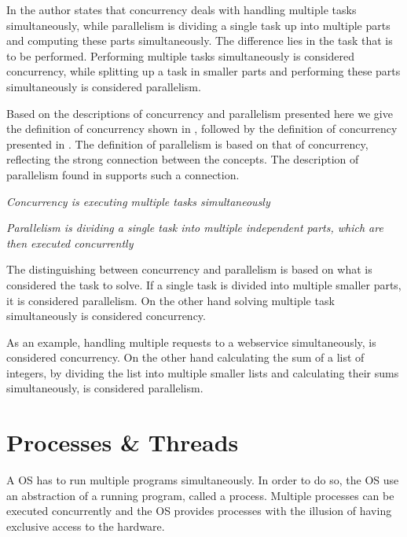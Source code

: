 In \cite[p. 24]{sevenModels} the author states that concurrency deals with handling multiple tasks simultaneously, while parallelism is dividing a single task up into multiple parts and computing these parts simultaneously. The difference lies in the task that is to be performed. Performing multiple tasks simultaneously is considered concurrency, while splitting up a task in smaller parts and performing these parts simultaneously is considered parallelism.

Based on the descriptions of concurrency and parallelism presented here we give the definition of concurrency shown in , followed by the definition of concurrency presented in . The definition of parallelism is based on that of concurrency, reflecting the strong connection between the concepts. The description of parallelism found in \cite{introPar} supports such a connection.
\begin{defn}\label{def:concurrency}
\emph{Concurrency is executing multiple tasks simultaneously}
\end{defn}

\begin{defn}\label{def:parallelism}
\emph{Parallelism is dividing a single task into multiple independent parts, which are then executed concurrently}
\end{defn}
The distinguishing between concurrency and parallelism is based on what is considered the task to solve. If a single task is divided into multiple smaller parts, it is considered parallelism. On the other hand solving multiple task simultaneously is considered concurrency.

As an example, handling multiple requests to a webservice simultaneously, is considered concurrency. On the other hand calculating the sum of a list of integers, by dividing the list into multiple smaller lists and calculating their sums simultaneously, is considered parallelism.

\section{Processes \& Threads}\label{sec:processes_threads}
A \ac{OS} has to run multiple programs simultaneously. In order to do so, the \ac{OS} use an abstraction of a running program, called a process\cite[p. 81]{tanenbaum2008modern}\cite[p. 16]{bryant2011computer}. Multiple processes can be executed concurrently and the \ac{OS} provides processes with the illusion of having exclusive access to the hardware\cite[p. 16]{bryant2011computer}. 

